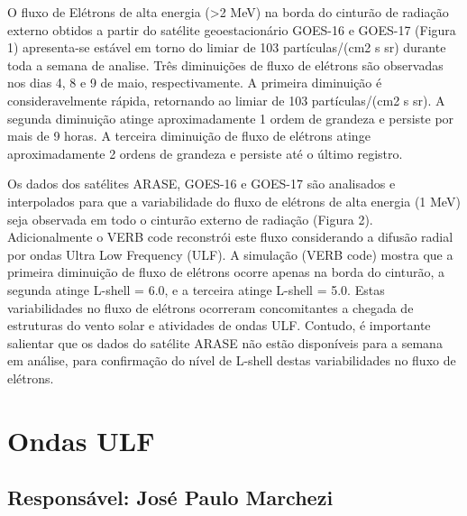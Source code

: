 \documentclass[11pt, oneside]{article}
\begin{document}
                     O fluxo de Elétrons de alta energia (>2 MeV) na borda do cinturão de radiação externo obtidos a partir do satélite geoestacionário GOES-16 e GOES-17 (Figura 1) apresenta-se estável em torno do limiar de 103 partículas/(cm2 s sr) durante toda a semana de analise. Três diminuições de fluxo de elétrons são observadas nos dias 4, 8 e 9 de maio, respectivamente. A primeira diminuição é consideravelmente rápida, retornando ao limiar de 103 partículas/(cm2 s sr). A segunda diminuição atinge aproximadamente 1 ordem de grandeza e persiste por mais de 9 horas. A terceira diminuição de fluxo de elétrons atinge aproximadamente 2 ordens de grandeza e persiste até o último registro. 

Os dados dos satélites ARASE, GOES-16 e GOES-17 são analisados e interpolados para que a variabilidade do fluxo de elétrons de alta energia (1 MeV) seja observada em todo o cinturão externo de radiação (Figura 2). Adicionalmente o VERB code reconstrói este fluxo considerando a difusão radial por ondas Ultra Low Frequency (ULF). A simulação (VERB code) mostra que a primeira diminuição de fluxo de elétrons ocorre apenas na borda do cinturão, a segunda atinge L-shell = 6.0, e a terceira atinge L-shell = 5.0. Estas variabilidades no fluxo de elétrons ocorreram concomitantes a chegada de estruturas do vento solar e atividades de ondas ULF. Contudo, é importante salientar que os dados do satélite ARASE não estão disponíveis para a semana em análise, para confirmação do nível de L-shell destas variabilidades no fluxo de elétrons.



\section{Ondas ULF} 
 \subsection{Responsável: José Paulo Marchezi} 
 
\end{document}
